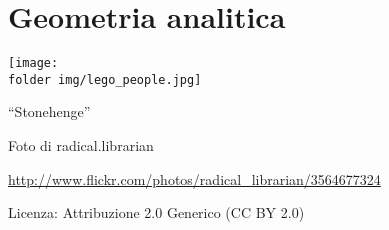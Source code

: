 
\part{Geometria analitica}

\texttt{[image: \\folder img/lego\_people.jpg]}
  \begin{center}
    {\large ``Stonehenge''}\par
    Foto di radical.librarian\par
    \url{http://www.flickr.com/photos/radical_librarian/3564677324}\par
    Licenza: Attribuzione 2.0 Generico (CC BY 2.0)\par
  \end{center}
\clearpage
\cleardoublepage
